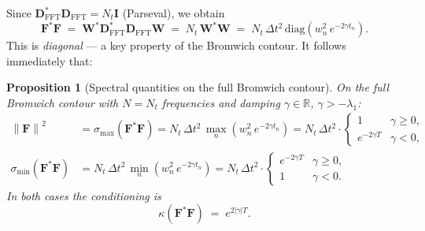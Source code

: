 \documentclass[11pt, a4paper]{article}
\newtheorem{proposition}[theorem]{Proposition}
\newcommand{\R}{\mathbb{R}}
\newcommand{\norm}[1]{\left\|#1\right\|}
\begin{document}
Since $\mathbf{D}_{\mathrm{FFT}}^*\mathbf{D}_{\mathrm{FFT}} = N_t\mathbf{I}$
(Parseval), we obtain
\begin{equation}
  \label{eq:FstarF_bromwich}
  \mathbf{F}^*\mathbf{F}
  \;=\; \mathbf{W}^*\mathbf{D}_{\mathrm{FFT}}^*\mathbf{D}_{\mathrm{FFT}}\mathbf{W}
  \;=\; N_t\,\mathbf{W}^*\mathbf{W}
  \;=\; N_t\,\Delta t^2\,\mathrm{diag}\!\left(w_n^2\, e^{-2\gamma t_n}\right).
\end{equation}
This is \emph{diagonal} --- a key property of the Bromwich contour.
It follows immediately that:
 
\begin{proposition}[Spectral quantities on the full Bromwich contour]
  \label{prop:bromwich_full}
  On the full Bromwich contour with $N = N_t$ frequencies and damping
  $\gamma \in \R$, $\gamma > -\lambda_1$:
  \begin{align}
    \norm{\mathbf{F}}^2
    &= \sigma_{\max}(\mathbf{F}^*\mathbf{F})
     = N_t\,\Delta t^2\,\max_n\!\left(w_n^2\,e^{-2\gamma t_n}\right)
     = N_t\,\Delta t^2\cdot
       \begin{cases}
         1 & \gamma \geq 0, \\
         e^{-2\gamma T} & \gamma < 0,
       \end{cases}
    \label{eq:F_norm_bromwich} \\[6pt]
    \sigma_{\min}(\mathbf{F}^*\mathbf{F})
    &= N_t\,\Delta t^2\,\min_n\!\left(w_n^2\,e^{-2\gamma t_n}\right)
     = N_t\,\Delta t^2\cdot
       \begin{cases}
         e^{-2\gamma T} & \gamma \geq 0, \\
         1 & \gamma < 0.
       \end{cases}
    \label{eq:sigmin_bromwich}
  \end{align}
  In both cases the conditioning is
  \begin{equation}
    \label{eq:cond_bromwich}
    \kappa(\mathbf{F}^*\mathbf{F}) \;=\; e^{2|\gamma| T}.
  \end{equation}
\end{proposition}
 
\end{document}
